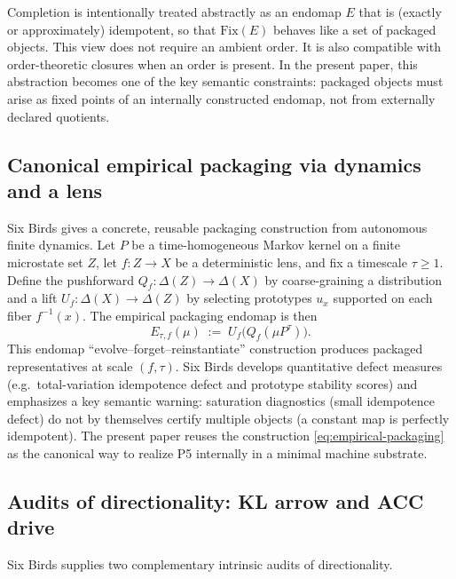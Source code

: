 \documentclass[11pt]{article}
\theoremstyle{definition}
\theoremstyle{remark}
\begin{document}
Completion is intentionally treated abstractly as an endomap $E$ that is (exactly or approximately) idempotent, so that $\mathrm{Fix}(E)$ behaves like a set of packaged objects.
This view does not require an ambient order.
It is also compatible with order-theoretic closures when an order is present.
In the present paper, this abstraction becomes one of the key semantic constraints: packaged objects must arise as fixed points of an internally constructed endomap, not from externally declared quotients.

\subsection{Canonical empirical packaging via dynamics and a lens}

Six Birds gives a concrete, reusable packaging construction from autonomous finite dynamics.
Let $P$ be a time-homogeneous Markov kernel on a finite microstate set $Z$, let $f:Z\to X$ be a deterministic lens, and fix a timescale $\tau\ge 1$.
Define the pushforward $Q_f:\Delta(Z)\to\Delta(X)$ by coarse-graining a distribution and a lift $U_f:\Delta(X)\to\Delta(Z)$ by selecting prototypes $u_x$ supported on each fiber $f^{-1}(x)$.
The empirical packaging endomap is then
\begin{equation}
\label{eq:empirical-packaging}
E_{\tau,f}(\mu)\;:=\;U_f\!\big(Q_f(\mu P^\tau)\big).
\end{equation}
This endomap ``evolve--forget--reinstantiate'' construction produces packaged representatives at scale $(f,\tau)$.
Six Birds develops quantitative defect measures (e.g.\ total-variation idempotence defect and prototype stability scores) and emphasizes a key semantic warning: saturation diagnostics (small idempotence defect) do not by themselves certify multiple objects (a constant map is perfectly idempotent).
The present paper reuses the construction \eqref{eq:empirical-packaging} as the canonical way to realize P5 internally in a minimal machine substrate.

\subsection{Audits of directionality: KL arrow and ACC drive}

Six Birds supplies two complementary intrinsic audits of directionality.
\end{document}
